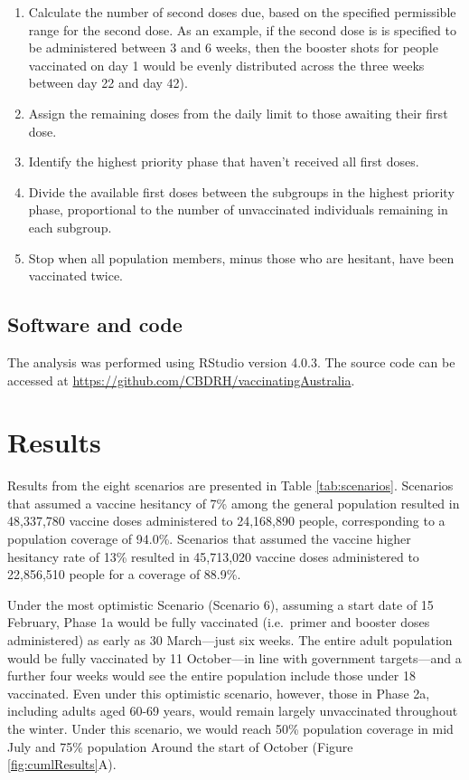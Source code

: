 \documentclass{article}
\begin{document}
\begin{enumerate}
\def\labelenumi{\arabic{enumi}.}
\item
  Calculate the number of second doses due, based on the specified
  permissible range for the second dose. As an example, if the second
  dose is is specified to be administered between 3 and 6 weeks, then
  the booster shots for people vaccinated on day 1 would be evenly
  distributed across the three weeks between day 22 and day 42).
\item
  Assign the remaining doses from the daily limit to those awaiting
  their first dose.
\item
  Identify the highest priority phase that haven't received all first
  doses.
\item
  Divide the available first doses between the subgroups in the highest
  priority phase, proportional to the number of unvaccinated individuals
  remaining in each subgroup.
\item
  Stop when all population members, minus those who are hesitant, have
  been vaccinated twice.
\end{enumerate}

\hypertarget{software-and-code}{%
\subsection{Software and code}\label{software-and-code}}

The analysis was performed using RStudio version 4.0.3. The source code
can be accessed at \url{https://github.com/CBDRH/vaccinatingAustralia}.

\hypertarget{results}{%
\section{Results}\label{results}}

Results from the eight scenarios are presented in Table
\ref{tab:scenarios}. Scenarios that assumed a vaccine hesitancy of 7\%
among the general population resulted in 48,337,780 vaccine doses
administered to 24,168,890 people, corresponding to a population
coverage of 94.0\%. Scenarios that assumed the vaccine higher hesitancy
rate of 13\% resulted in 45,713,020 vaccine doses administered to
22,856,510 people for a coverage of 88.9\%.

Under the most optimistic Scenario (Scenario 6), assuming a start date
of 15 February, Phase 1a would be fully vaccinated (i.e.~primer and
booster doses administered) as early as 30 March---just six weeks. The
entire adult population would be fully vaccinated by 11 October---in
line with government targets---and a further four weeks would see the
entire population include those under 18 vaccinated. Even under this
optimistic scenario, however, those in Phase 2a, including adults aged
60-69 years, would remain largely unvaccinated throughout the winter.
Under this scenario, we would reach 50\% population coverage in mid July
and 75\% population Around the start of October (Figure
\ref{fig:cumlResults}A).
\end{document}
